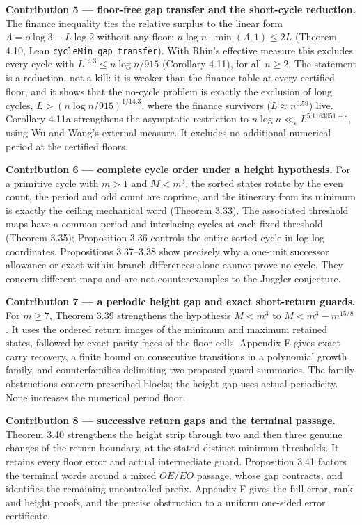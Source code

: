 \documentclass[12pt]{article}
\begin{document}
\textbf{Contribution 5 --- floor-free gap transfer and the short-cycle
reduction.} The finance inequality ties the relative surplus to the
linear form \(\Lambda=o\log 3-L\log 2\) without any floor:
\(n\log n\cdot\min(\Lambda,1)\le 2L\) (Theorem 4.10, Lean
\texttt{\nolinkurl{cycleMin_gap_transfer}}). With Rhin's effective
measure this excludes every cycle with \(L^{14.3}\le n\log n/915\)
(Corollary 4.11), for all \(n\ge 2\). The statement is a reduction, not
a kill: it is weaker than the finance table at every certified floor,
and it shows that the no-cycle problem is exactly the exclusion of long
cycles, \(L>(n\log n/915)^{1/14.3}\), where the finance survivors
(\(L\approx n^{0.59}\)) live. Corollary 4.11a strengthens the asymptotic
restriction to \(n\log n\ll_\varepsilon L^{5.1163051+\varepsilon}\),
using Wu and Wang's external measure. It excludes no additional
numerical period at the certified floors.

\textbf{Contribution 6 --- complete cycle order under a height
hypothesis.} For a primitive cycle with \(m>1\) and \(M<m^3\), the
sorted states rotate by the even count, the period and odd count are
coprime, and the itinerary from its minimum is exactly the ceiling
mechanical word (Theorem 3.33). The associated threshold maps have a
common period and interlacing cycles at each fixed threshold (Theorem
3.35); Proposition 3.36 controls the entire sorted cycle in log-log
coordinates. Propositions 3.37--3.38 show precisely why a one-unit
successor allowance or exact within-branch differences alone cannot
prove no-cycle. They concern different maps and are not counterexamples
to the Juggler conjecture.

\textbf{Contribution 7 --- a periodic height gap and exact short-return
guards.} For \(m\ge7\), Theorem 3.39 strengthens the hypothesis
\(M<m^3\) to \(M<m^3-m^{15/8}\). It uses the ordered return images of
the minimum and maximum retained states, followed by exact parity faces
of the floor cells. Appendix E gives exact carry recovery, a finite
bound on consecutive transitions in a polynomial growth family, and
counterfamilies delimiting two proposed guard summaries. The family
obstructions concern prescribed blocks; the height gap uses actual
periodicity. None increases the numerical period floor.

\textbf{Contribution 8 --- successive return gaps and the terminal
passage.} Theorem 3.40 strengthens the height strip through two and then
three genuine changes of the return boundary, at the stated distinct
minimum thresholds. It retains every floor error and actual intermediate
guard. Proposition 3.41 factors the terminal words around a mixed
\(OE/EO\) passage, whose gap contracts, and identifies the remaining
uncontrolled prefix. Appendix F gives the full error, rank and height
proofs, and the precise obstruction to a uniform one-sided error
certificate.
\end{document}
